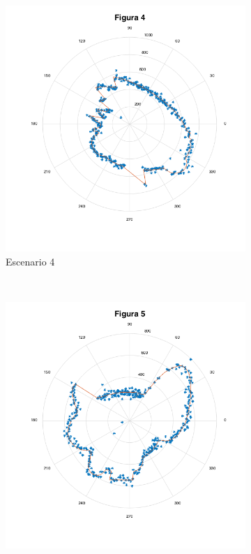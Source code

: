 \documentclass[letterpaper,11pt]{article}
\begin{document}
\begin{figure}[H]
    \centering
        \begin{subfigure}[b]{0.45\textwidth}
        \includegraphics[width=\textwidth]{img/parte_b/figura4.png}
        \caption{Escenario 4}
    \end{subfigure}
    ~
    \begin{subfigure}[b]{0.45\textwidth}
        \includegraphics[width=\textwidth]{img/parte_b/figura5.png}

\end{subfigure}
\end{figure}
\end{document}
